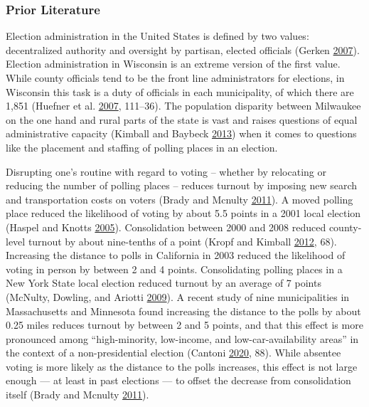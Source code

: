\documentclass[
  12pt,
]{article}
\begin{document}
\hypertarget{prior-literature}{%
\subsubsection*{Prior Literature}\label{prior-literature}}

Election administration in the United States is defined by two values: decentralized authority and oversight by partisan, elected officials (Gerken \protect\hyperlink{ref-Gerken2007}{2007}). Election administration in Wisconsin is an extreme version of the first value. While county officials tend to be the front line administrators for elections, in Wisconsin this task is a duty of officials in each municipality, of which there are 1,851 (Huefner et al. \protect\hyperlink{ref-Huefner2007}{2007}, 111--36). The population disparity between Milwaukee on the one hand and rural parts of the state is vast and raises questions of equal administrative capacity (Kimball and Baybeck \protect\hyperlink{ref-Kimball2013}{2013}) when it comes to questions like the placement and staffing of polling places in an election.

Disrupting one's routine with regard to voting -- whether by relocating or reducing the number of polling places -- reduces turnout by imposing new search and transportation costs on voters (Brady and Mcnulty \protect\hyperlink{ref-Brady2011}{2011}). A moved polling place reduced the likelihood of voting by about 5.5 points in a 2001 local election (Haspel and Knotts \protect\hyperlink{ref-Haspel2005}{2005}). Consolidation between 2000 and 2008 reduced county-level turnout by about nine-tenths of a point (Kropf and Kimball \protect\hyperlink{ref-Kropf2012}{2012}, 68). Increasing the distance to polls in California in 2003 reduced the likelihood of voting in person by between 2 and 4 points. Consolidating polling places in a New York State local election reduced turnout by an average of 7 points (McNulty, Dowling, and Ariotti \protect\hyperlink{ref-McNulty2009}{2009}). A recent study of nine municipalities in Massachusetts and Minnesota found increasing the distance to the polls by about 0.25 miles reduces turnout by between 2 and 5 points, and that this effect is more pronounced among ``high-minority, low-income, and low-car-availability areas'' in the context of a non-presidential election (Cantoni \protect\hyperlink{ref-Cantoni2020}{2020}, 88). While absentee voting is more likely as the distance to the polls increases, this effect is not large enough --- at least in past elections --- to offset the decrease from consolidation itself (Brady and Mcnulty \protect\hyperlink{ref-Brady2011}{2011}).
\end{document}
